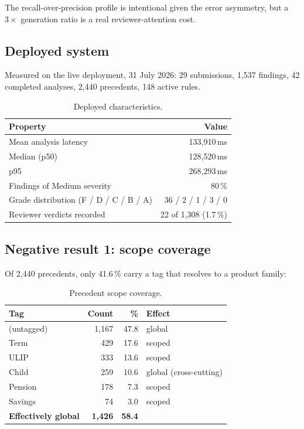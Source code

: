 \documentclass[10pt]{article}
\begin{document}
The recall-over-precision profile is intentional given the error asymmetry, but
a $3\times$ generation ratio is a real reviewer-attention cost.

\subsection{Deployed system}

Measured on the live deployment, 31 July 2026: 29 submissions, 1{,}537
findings, 42 completed analyses, 2{,}440 precedents, 148 active rules.

\begin{table}[htbp]
\centering
\caption{Deployed characteristics.}
\begin{tabular}{@{}lr@{}}
\toprule
\textbf{Property} & \textbf{Value} \\
\midrule
Mean analysis latency & 133{,}910\,ms \\
Median (p50) & 128{,}520\,ms \\
p95 & 268{,}293\,ms \\
Findings of Medium severity & 80\,\% \\
Grade distribution (F / D / C / B / A) & 36 / 2 / 1 / 3 / 0 \\
Reviewer verdicts recorded & 22 of 1{,}308 (1.7\,\%) \\
\bottomrule
\end{tabular}
\end{table}

\subsection{Negative result 1: scope coverage}
\label{sec:scopecoverage}

Of 2{,}440 precedents, only 41.6\,\% carry a tag that resolves to a product
family:

\begin{table}[htbp]
\centering
\caption{Precedent scope coverage.}
\begin{tabular}{@{}lrrl@{}}
\toprule
\textbf{Tag} & \textbf{Count} & \textbf{\%} & \textbf{Effect} \\
\midrule
(untagged) & 1{,}167 & 47.8 & global \\
Term       & 429 & 17.6 & scoped \\
ULIP       & 333 & 13.6 & scoped \\
Child      & 259 & 10.6 & global (cross-cutting) \\
Pension    & 178 &  7.3 & scoped \\
Savings    &  74 &  3.0 & scoped \\
\midrule
\textbf{Effectively global} & \textbf{1{,}426} & \textbf{58.4} & \\
\bottomrule
\end{tabular}
\end{table}
\end{document}
